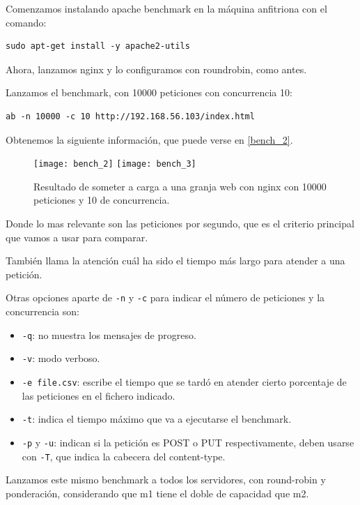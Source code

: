 Comenzamos instalando apache benchmark en la máquina anfitriona con el comando:

\begin{verbatim}
sudo apt-get install -y apache2-utils
\end{verbatim}

Ahora, lanzamos nginx y lo configuramos con roundrobin, como antes.

Lanzamos el benchmark, con 10000 peticiones con concurrencia 10:

\begin{verbatim}
ab -n 10000 -c 10 http://192.168.56.103/index.html
\end{verbatim}

Obtenemos la siguiente información, que puede verse en \eqref{bench_2}.

\begin{figure}[h!]
\begin{center}
\caption{Resultado de someter a carga a una granja web con nginx con 10000 peticiones y 10 de concurrencia.}
\label{bench_2}
\texttt{[image: bench\_2]}
\texttt{[image: bench\_3]}
\end{center}
\end{figure}

Donde lo mas relevante son las peticiones por segundo, que es el criterio principal que vamos a usar para comparar.

También llama la atención cuál ha sido el tiempo más largo para atender a una petición.

Otras opciones aparte de \verb|-n| y \verb|-c| para indicar el número de peticiones y la concurrencia son:
\begin{itemize}
\item \verb|-q|: no muestra los mensajes de progreso.
\item \verb|-v|: modo verboso.
\item \verb|-e file.csv|: escribe el tiempo que se tardó en atender cierto porcentaje de las peticiones en el fichero indicado.
\item \verb|-t|: indica el tiempo máximo que va a ejecutarse el benchmark.
\item \verb|-p| y \verb|-u|: indican si la petición es POST o PUT respectivamente, deben usarse con \verb|-T|, que indica la cabecera del content-type.
\end{itemize}

Lanzamos este mismo benchmark a todos los servidores, con round-robin y ponderación, considerando que m1 tiene el doble de capacidad que m2.

